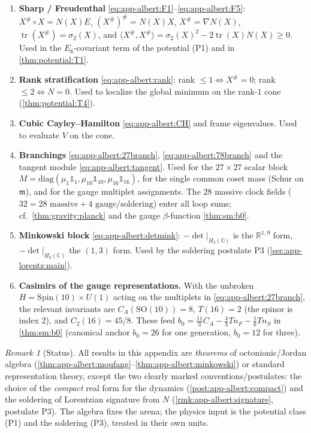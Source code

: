 \documentclass[11pt]{article}
\theoremstyle{plain}
\theoremstyle{definition}
\theoremstyle{remark}
\newtheorem{remark}[theorem]{Remark}
\begin{document}
\begin{enumerate}
  \item \textbf{Sharp / Freudenthal} \eqref{eq:app-albert:F1}--\eqref{eq:app-albert:F5}:
    $X^\#\circ X=N(X)E$, $(X^\#)^\#=N(X)X$, $X^\#=\nabla N(X)$,
    $\operatorname{tr}(X^\#)=\sigma_2(X)$, and
    $\langle X^\#,X^\#\rangle=\sigma_2(X)^2-2\operatorname{tr}(X)N(X)\ge0$. Used in
    the $E_6$-covariant term of the potential (P1) and in
    \autoref{thm:potential:T1}.
  \item \textbf{Rank stratification} \eqref{eq:app-albert:rank}: rank $\le1
    \Leftrightarrow X^\#=0$; rank $\le2\Leftrightarrow N=0$. Used to localize the
    global minimum on the rank-$1$ cone (\autoref{thm:potential:T4}).
  \item \textbf{Cubic Cayley--Hamilton} \eqref{eq:app-albert:CH} and frame
    eigenvalues. Used to evaluate $V$ on the cone.
  \item \textbf{Branchings} \eqref{eq:app-albert:27branch},
    \eqref{eq:app-albert:78branch} and the tangent module
    \eqref{eq:app-albert:tangent}. Used for the $27\times27$ scalar block
    $M=\mathrm{diag}(\mu_1\mathbb 1_1,\mu_{10}\mathbb 1_{10},\mu_{16}\mathbb 1_{16})$,
    for the single common coset mass (Schur on $\mathfrak m$), and for the gauge
    multiplet assignments. The $28$ massive clock fields
    ($32=28\text{ massive}+4\text{ gauge/soldering}$) enter all loop sums; cf.\
    \autoref{thm:gravity:planck} and the gauge $\beta$-function
    \autoref{thm:sm:b0}.
  \item \textbf{Minkowski block} \eqref{eq:app-albert:detmink}: $-\det|_{H_2
    (\mathbb O)}$ is the $\mathbb R^{1,9}$ form, $-\det|_{H_2(\mathbb C)}$ the
    $(1,3)$ form. Used by the soldering postulate P3
    (\autoref{sec:app-lorentz:main}).
  \item \textbf{Casimirs of the gauge representations.} With the unbroken
    $H=\mathrm{Spin}(10)\times U(1)$ acting on the multiplets in
    \eqref{eq:app-albert:27branch}, the relevant invariants are
    $C_A(\mathrm{SO}(10))=8$, $T(16)=2$ (the spinor is index $2$), and
    $C_2(16)=45/8$. These feed
    $b_0=\tfrac{11}{3}C_A-\tfrac43 T n_F-\tfrac16 T n_S$ in
    \autoref{thm:sm:b0} (canonical anchor $b_0=26$ for one generation,
    $b_0=12$ for three).
\end{enumerate}

\begin{remark}[Status]\label{rmk:app-albert:status}
All results in this appendix are \emph{theorems} of octonionic/Jordan algebra
(\autoref{thm:app-albert:moufang}--\autoref{thm:app-albert:minkowski}) or standard
representation theory, except the two clearly marked conventions/postulates: the
choice of the \emph{compact} real form for the dynamics
(\autoref{post:app-albert:compact}) and the soldering of Lorentzian signature from
$N$ (\autoref{rmk:app-albert:signature}, postulate P3). The algebra fixes the
arena; the physics input is the potential class (P1) and the soldering (P3),
treated in their own units.
\end{remark}
\end{document}

